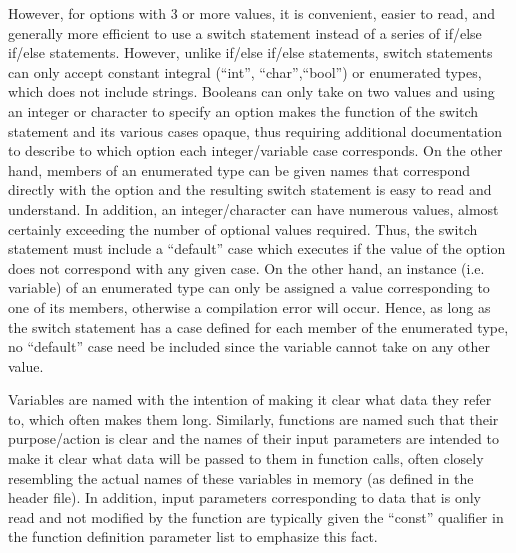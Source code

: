\documentclass{article}
\begin{document}
However, for options with 3 or more values, it is convenient, easier to read, and generally more efficient to use a switch statement instead of a series of if/else if/else statements.  However, unlike if/else if/else statements, switch statements can only accept constant integral (``int'', ``char'',``bool'') or enumerated types, which does not include strings.  Booleans can only take on two values and using an integer or character to specify an option makes the function of the switch statement and its various cases opaque, thus requiring additional documentation to describe to which option each integer/variable case corresponds.  On the other hand, members of an enumerated type can be given names that correspond directly with the option and the resulting switch statement is easy to read and understand.  In addition, an integer/character can have numerous values, almost certainly exceeding the number of optional values required.  Thus, the switch statement must include a ``default'' case which executes if the value of the option does not correspond with any given case. On the other hand, an instance (i.e. variable) of an enumerated type can only be assigned a value corresponding to one of its members, otherwise a compilation error will occur.  Hence, as long as the switch statement has a case defined for each member of the enumerated type, no ``default'' case need be included since the variable cannot take on any other value.


Variables are named with the intention of making it clear what data they refer to, which often makes them long.  Similarly, functions are named such that their purpose/action is clear and the names of their input parameters are intended to make it clear what data will be passed to them in function calls, often closely resembling the actual names of these variables in memory (as defined in the header file).  In addition, input parameters corresponding to data that is only read and not modified by the function are typically given the ``const'' qualifier in the function definition parameter list to emphasize this fact.
\end{document}
